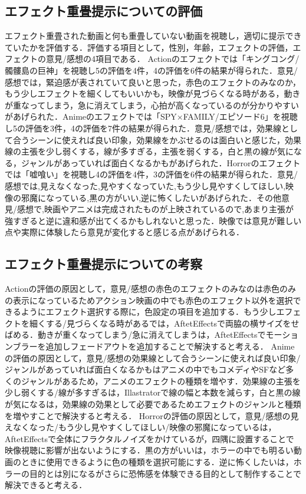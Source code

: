 \subsection{エフェクト重畳提示についての評価}

エフェクト重畳された動画と何も重畳していない動画を視聴し，適切に提示できていたかを評価する．評価する項目として，性別，年齢，エフェクトの評価，エフェクトの意見/感想の4項目である．
Actionのエフェクトでは「キングコング/ 髑髏島の巨神」を視聴し5の評価を4件，4の評価を6件の結果が得られた．意見/感想では，緊迫感が表されていて良いと思った，赤色のエフェクトのみなのか，もう少しエフェクトを細くしてもいいかも，映像が見づらくなる時がある，動きが重なってしまう，急に消えてしまう，心拍が高くなっているのが分かりやすいがあげられた．Animeのエフェクトでは「SPY×FAMILY/エピソード6」を視聴し5の評価を3件，4の評価を7件の結果が得られた．意見/感想では，効果線として合うシーンに使えれば良い印象，効果線をかぶせるのは面白いと感じた，効果線の主張を少し弱くする，線が多すぎる，主張を弱くする，白と黒の線が気になる，ジャンルがあっていれば面白くなるかもがあげられた．Horrorのエフェクトでは「嘘喰い」を視聴し4の評価を4件，3の評価を6件の結果が得られた．意見/感想では,見えなくなった,見やすくなっていた,もう少し見やすくしてほしい,映像の邪魔になっている,黒の方がいい,逆に怖くしたいがあげられた．その他意見/感想で,映画やアニメは完成されたものが上映されているので,あまり主張が強すぎると逆に違和感が出てくるかもしれないと思った．映像では意見が難しい点や実際に体験したら意見が変化すると感じる点があげられる．

\subsection{エフェクト重畳提示についての考察}
Actionの評価の原因として，意見/感想の赤色のエフェクトのみなのは赤色のみの表示になっているためアクション映画の中でも赤色のエフェクト以外を選択できるようにエフェクト選択する際に，色設定の項目を追加する．もう少しエフェクトを細くする/見づらくなる時があるでは，AftetEffectsで両脇の横サイズをせばめる．動きが重くなってしまう/急に消えてしまうは，AftetEffectsでモーションブラーを追加しフェードアウトを追加することで解決すると考える．
Animeの評価の原因として，意見/感想の効果線として合うシーンに使えれば良い印象/ジャンルがあっていれば面白くなるかもはアニメの中でもコメディやSFなど多くのジャンルがあるため，アニメのエフェクトの種類を増やす．効果線の主張を少し弱くする/線が多すぎるは，Illastratorで線の幅と本数を減らす，白と黒の線が気になるは，効果線の効果として必要であるためエフェクトのジャンルと種類を増やすことで解決すると考える．
Horrorの評価の原因として，意見/感想の見えなくなった/もう少し見やすくしてほしい/映像の邪魔になっているは，AftetEffectsで全体にフラクタルノイズをかけているが，四隅に設置することで映像視聴に影響が出ないようにする．黒の方がいいは，ホラーの中でも明るい動画のときに使用できるように色の種類を選択可能にする．逆に怖くしたいは，ホラーの目的とは別になるがさらに恐怖感を体験できる目的として制作することで解決できると考える．
